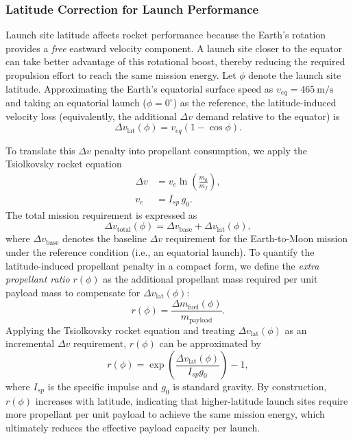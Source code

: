 \documentclass{mcmthesis}
\begin{document}
\subsubsection{Latitude Correction for Launch Performance}
Launch site latitude affects rocket performance because the Earth’s rotation provides a \emph{free} eastward velocity component. A launch site closer to the equator can take better advantage of this rotational boost, thereby reducing the required propulsion effort to reach the same mission energy. Let $\phi$ denote the launch site latitude. Approximating the Earth’s equatorial surface speed as $v_{eq}=465~\text{m/s}$ and taking an equatorial launch ($\phi=0^\circ$) as the reference, the latitude-induced velocity loss (equivalently, the additional $\Delta v$ demand relative to the equator) is
\begin{equation}
\Delta v_{\text{lat}}(\phi)=v_{eq}\left(1-\cos \phi\right).
\end{equation}

To translate this $\Delta v$ penalty into propellant consumption, we apply the Tsiolkovsky rocket equation
\begin{align}
\Delta v &= v_e \ln\!\left(\frac{m_0}{m_f}\right), \label{eq:rocket} \\
v_e &= I_{sp}\, g_0. \label{eq:ve}
\end{align}
The total mission requirement is expressed as
\begin{equation}
\Delta v_{\text{total}}(\phi)=\Delta v_{\text{base}}+\Delta v_{\text{lat}}(\phi),
\end{equation}
where $\Delta v_{\text{base}}$ denotes the baseline $\Delta v$ requirement for the Earth-to-Moon mission under the reference condition (i.e., an equatorial launch). 
To quantify the latitude-induced propellant penalty in a compact form, we define the \emph{extra propellant ratio} $r(\phi)$ as the additional propellant mass required per unit payload mass to compensate for $\Delta v_{\text{lat}}(\phi)$:
\begin{equation}
r(\phi)= \frac{\Delta m_{\text{fuel}}(\phi)}{m_{\text{payload}}}.
\end{equation}
Applying the Tsiolkovsky rocket equation and treating $\Delta v_{\text{lat}}(\phi)$ as an incremental $\Delta v$ requirement, $r(\phi)$ can be approximated by
\begin{equation}
r(\phi)=\exp\!\left(\frac{\Delta v_{\text{lat}}(\phi)}{I_{sp}g_0}\right)-1,
\end{equation}
where $I_{sp}$ is the specific impulse and $g_0$ is standard gravity. 
By construction, $r(\phi)$ increases with latitude, indicating that higher-latitude launch sites require more propellant per unit payload to achieve the same mission energy, which ultimately reduces the effective payload capacity per launch.
\end{document}
